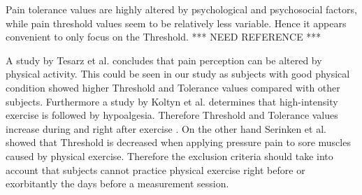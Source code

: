 Pain tolerance values are highly altered by psychological and psychosocial factors, while pain threshold values seem to be relatively less
variable. Hence it appears convenient to only focus on the Threshold. *** NEED REFERENCE ***

A study by Tesarz et al. \cite{Tesarz2012} concludes that pain perception can be altered by physical activity. This could be seen in our study as subjects with good physical condition showed higher Threshold and Tolerance values compared with other subjects.
Furthermore a study by Koltyn et al. \cite{Koltyn2002} determines that high-intensity exercise is followed by hypoalgesia. Therefore Threshold and Tolerance values increase during and right after exercise \cite{Koltyn2002}. On the other hand Serinken et al. \cite{Serinken2013} showed that Threshold is decreased when applying pressure pain to sore muscles caused by physical exercise. Therefore the exclusion criteria should take into account that subjects cannot practice physical exercise right before or exorbitantly the days before a measurement session.


